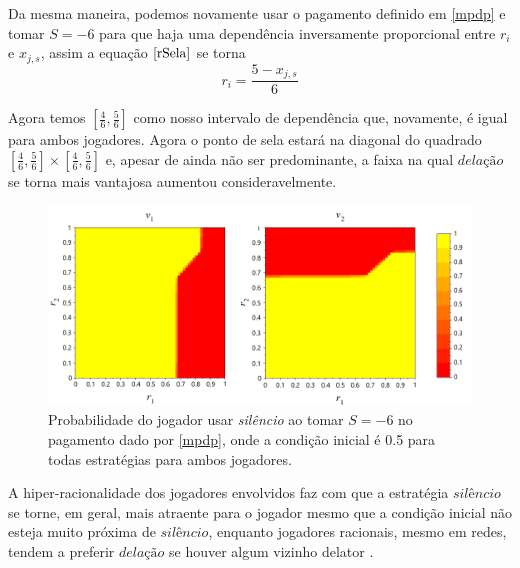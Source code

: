 Da mesma maneira, podemos novamente usar o pagamento definido em \ref{mpdp} e tomar $S=-6$ para que haja uma dependência inversamente proporcional entre $r_i$ e $x_{j,s}$, assim a equação $\eqref{rSela}$ se torna
\begin{equation}
    r_i=\frac{5-x_{j,s}}{6}
\end{equation}

Agora temos $[\frac{4}{6},\frac{5}{6}]$ como nosso intervalo de dependência que, novamente, é igual para ambos jogadores. Agora o ponto de sela estará na diagonal do quadrado $[\frac{4}{6},\frac{5}{6}]\times[\frac{4}{6},\frac{5}{6}]$ e, apesar de ainda não ser predominante, a faixa na qual $\textit{delação}$ se torna mais vantajosa aumentou consideravelmente.

\begin{figure}[h]
    \caption{Probabilidade do jogador usar \textit{silêncio} ao tomar $S=-6$ no pagamento dado por \ref{mpdp}, onde a condição inicial é 0.5 para todas estratégias para ambos jogadores.}
    \centerline{\includegraphics[scale=0.43]{./img/PD-neg-payoff-inverse-dep.png}}
    \label{fig:pd-neg-payoff-inverse-dep}
\end{figure}

A hiper-racionalidade dos jogadores envolvidos faz com que a estratégia $\textit{silêncio}$ se torne, em geral, mais atraente para o jogador mesmo que a condição inicial não esteja muito próxima de $\textit{silêncio}$, enquanto jogadores racionais, mesmo em redes, tendem a preferir $\textit{delação}$ se houver algum vizinho delator \cite{madeo2015}.